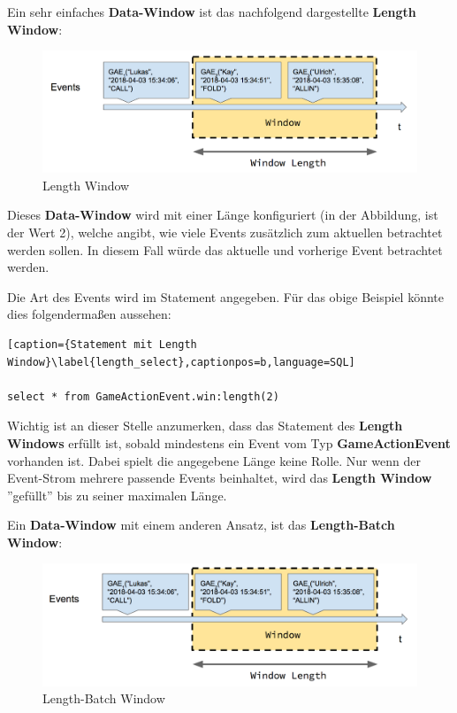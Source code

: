 Ein sehr einfaches \textbf{Data-Window} ist das nachfolgend dargestellte \textbf{Length Window}: 

\begin{figure}[ht]
	\centering
	\includegraphics[width=\textwidth,height=\textheight,keepaspectratio]{images/data_window_length.png}
	\caption{Length Window}
	\label{LengthWindow}
\end{figure}

Dieses \textbf{Data-Window} wird mit einer Länge konfiguriert (in der Abbildung, ist der Wert 2), welche angibt, wie viele Events zusätzlich zum aktuellen betrachtet werden sollen. In diesem Fall würde das aktuelle und vorherige Event betrachtet werden.

Die Art des Events wird im Statement angegeben. Für das obige Beispiel könnte dies folgendermaßen aussehen:

\begin{lstlisting}[caption={Statement mit Length Window}\label{length_select},captionpos=b,language=SQL]

select * from GameActionEvent.win:length(2)

\end{lstlisting}

Wichtig ist an dieser Stelle anzumerken, dass das Statement des \textbf{Length Windows} erfüllt ist, sobald mindestens ein Event vom Typ \textbf{GameActionEvent} vorhanden ist. Dabei spielt die angegebene Länge keine Rolle. Nur wenn der Event-Strom mehrere passende Events beinhaltet, wird das \textbf{Length Window} ''gefüllt'' bis zu seiner maximalen Länge.

Ein \textbf{Data-Window} mit einem anderen Ansatz, ist das \textbf{Length-Batch Window}:

\begin{figure}[ht]
	\centering
	\includegraphics[width=\textwidth,height=\textheight,keepaspectratio]{images/data_window_length_batch.png}
	\caption{Length-Batch Window}
	\label{LengthBatchWindow}
\end{figure}

